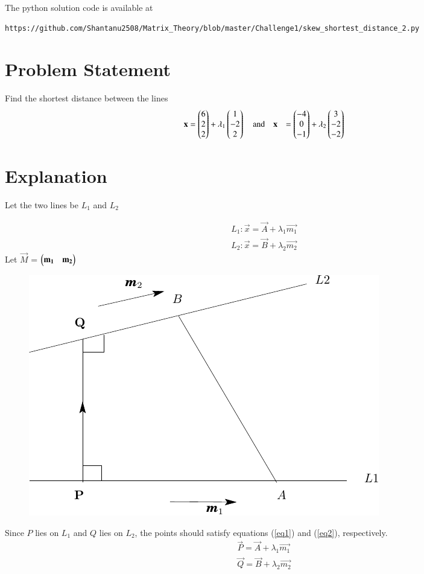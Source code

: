 \documentclass[journal,12pt,twocolumn]{IEEEtran}
\begin{document}
The python solution code is available at
\begin{lstlisting}
https://github.com/Shantanu2508/Matrix_Theory/blob/master/Challenge1/skew_shortest_distance_2.py
\end{lstlisting}
\section{Problem Statement}
Find the shortest distance between the lines
\begin{align}
	\mathbf{x} &=\begin{pmatrix}6\\2\\2\end{pmatrix} + \lambda_1 \begin{pmatrix}1\\-2\\2\end{pmatrix} \quad \text{and} \quad 
	\mathbf{x} &= \begin{pmatrix}-4\\0\\-1\end{pmatrix} + \lambda_2 \begin{pmatrix}3\\-2\\-2\end{pmatrix}
\end{align}
\section{Explanation}
	Let the two lines be $L_1$ and $L_2$

\begin{align}
	L_1 : \vec{x} = \vec{A} + \lambda_1\vec{m_1}     \label{eq1}
\end{align}
\begin{align}
        L_2 : \vec{x} = \vec{B} + \lambda_2\vec{m_2}     \label{eq2}
\end{align}
Let $\vec{M}$ = $\begin{pmatrix}\mathbf{m_1} & \mathbf{m_2}\end{pmatrix}$

\begin{figure}[htbp]
\includegraphics[width=\columnwidth]{skewlines.pdf}
	\caption{} \label{linefig1}
\end{figure}
\noindent
Since $P$ lies on $L_1$ and $Q$ lies on $L_2$, the points should satisfy 
	equations (\ref{eq1}) and (\ref{eq2}), respectively.
\begin{align}
        \vec{P} = \vec{A} + \lambda_1\vec{m_1} \\
        \vec{Q} = \vec{B} + \lambda_2\vec{m_2}
\end{align}
\end{document}
